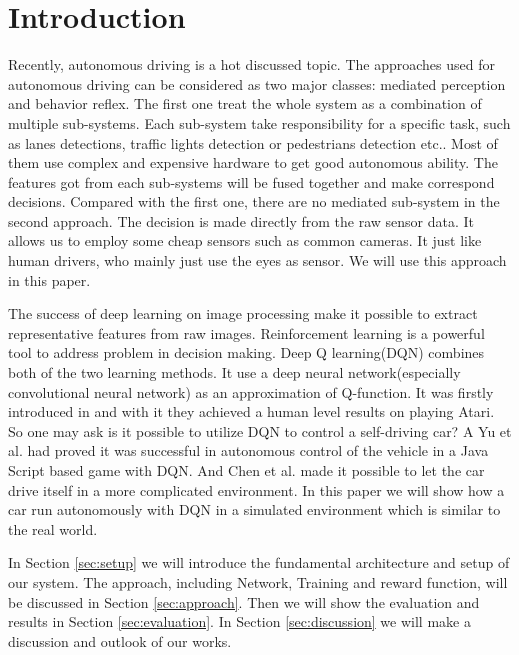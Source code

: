 
\section{Introduction}

Recently, autonomous driving is a hot discussed topic. The approaches used for autonomous driving can be considered as two major classes: mediated perception and behavior reflex. The first one treat the whole system as a combination of multiple sub-systems. Each sub-system take responsibility for a specific task, such as lanes detections, traffic lights detection or pedestrians detection etc.. Most of them use complex and expensive hardware to get good autonomous ability. The features got from each sub-systems will be fused together and make correspond decisions. Compared with the first one, there are no mediated sub-system in the second approach. The decision is made directly from the raw sensor data. It allows us to employ some cheap sensors such as common cameras. It just like human drivers, who mainly just use the eyes as sensor. We will use this approach in this paper.

The success of deep learning on image processing make it possible to extract representative features from raw images. Reinforcement learning is a powerful tool to address problem in decision making. Deep Q learning(DQN) combines both of the two learning methods. It use a deep neural network(especially convolutional neural network) as an approximation of Q-function. It was firstly introduced in \cite{Mnih13} and with it they achieved  a human level results on playing Atari. So one may ask is it possible to utilize DQN to control a self-driving car? A Yu et al. \cite{yudeep} had proved it was successful in autonomous control of the vehicle in a Java Script based game with DQN. And Chen et al. \cite{chen2015deepdriving} made it possible to let the car drive itself in a more complicated environment. In this paper we will show how a car run autonomously with DQN in a simulated environment which is similar to the real world. 

In Section \ref{sec:setup} we will introduce the fundamental architecture and setup of our system. The approach, including Network, Training and reward function, will be discussed in Section \ref{sec:approach}. Then we will show the evaluation and results in Section \ref{sec:evaluation}. In Section \ref{sec:discussion} we will make a discussion and outlook of our works. 

